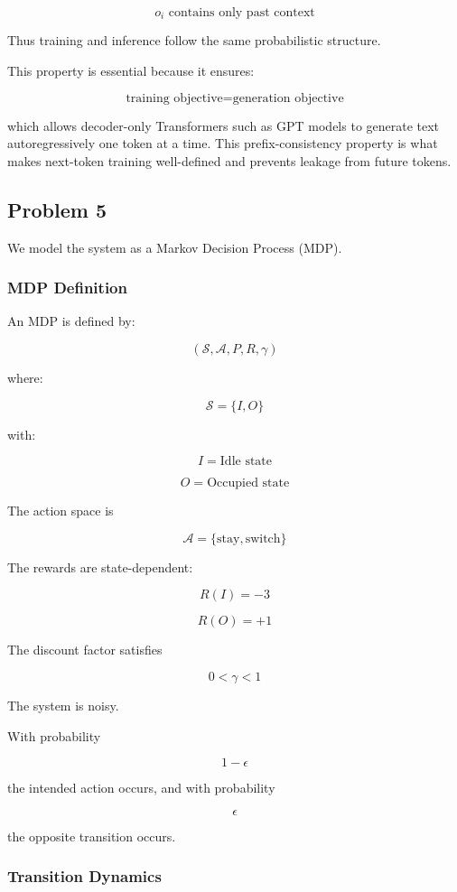 \documentclass[12pt]{article}
\begin{document}
\[
o_i
\text{ contains only past context}
\]

Thus training and inference follow the same probabilistic structure.

This property is essential because it ensures:

\[
\text{training objective}
=
\text{generation objective}
\]

which allows decoder-only Transformers such as GPT models to generate text autoregressively one token at a time.
This prefix-consistency property is what makes next-token training well-defined and prevents leakage from future tokens.



\subsection*{Problem 5}

We model the system as a Markov Decision Process (MDP).

\subsubsection*{MDP Definition}

An MDP is defined by:

\[
(\mathcal S,\mathcal A,P,R,\gamma)
\]

where:

\[
\mathcal S = \{I,O\}
\]

with:

\[
I = \text{Idle state}
\]

\[
O = \text{Occupied state}
\]

The action space is

\[
\mathcal A = \{\text{stay},\text{switch}\}
\]

The rewards are state-dependent:

\[
R(I) = -3
\]

\[
R(O) = +1
\]

The discount factor satisfies

\[
0<\gamma<1
\]

The system is noisy.

With probability

\[
1-\epsilon
\]

the intended action occurs, and with probability

\[
\epsilon
\]

the opposite transition occurs.

\subsubsection*{Transition Dynamics}
\end{document}

